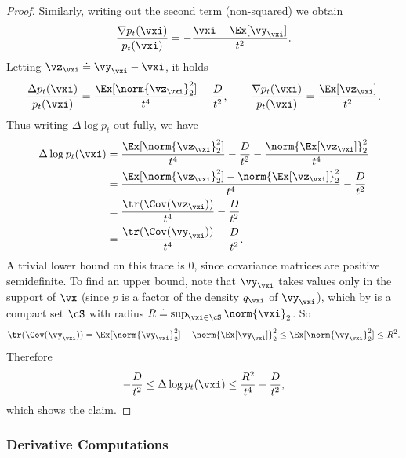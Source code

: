 \documentclass[../../book-main.tex]{subfiles}
\begin{document}
\begin{proof}
    Similarly, writing out the second term (non-squared) we obtain
    \begin{equation}
        \frac{\nabla p_{t}(\vxi)}{p_{t}(\vxi)} = -\frac{\vxi -
        \Ex[\vy_{\vxi}]}{t^{2}}.
    \end{equation}
    Letting \(\vz_{\vxi} \doteq \vy_{\vxi} - \vxi\), it holds
    \begin{equation}
        \frac{\Delta p_{t}(\vxi)}{p_{t}(\vxi)} =
        \frac{\Ex[\norm{\vz_{\vxi}}_{2}^{2}]}{t^{4}} -
        \frac{D}{t^{2}}, \qquad \frac{\nabla
        p_{t}(\vxi)}{p_{t}(\vxi)} = \frac{\Ex[\vz_{\vxi}]}{t^{2}}.
    \end{equation}
    Thus writing \(\Delta \log p_{t}\) out fully, we have
    \begin{align}
        \Delta \log p_{t}(\vxi)
        &= \frac{\Ex[\norm{\vz_{\vxi}}_{2}^{2}]}{t^{4}} -
        \frac{D}{t^{2}} - \frac{\norm{\Ex[\vz_{\vxi}]}_{2}^{2}}{t^{4}} \\
        &= \frac{\Ex[\norm{\vz_{\vxi}}_{2}^{2}] -
        \norm{\Ex[\vz_{\vxi}]}_{2}^{2}}{t^{4}} - \frac{D}{t^{2}} \\
        &= \frac{\tr(\Cov(\vz_{\vxi}))}{t^{4}} - \frac{D}{t^{2}} \\
        &= \frac{\tr(\Cov(\vy_{\vxi}))}{t^{4}} - \frac{D}{t^{2}}.
    \end{align}
    A trivial lower bound on this trace is \(0\), since covariance
    matrices are positive semidefinite. To find an upper bound, note
    that \(\vy_{\vxi}\) takes values only in the support of \(\vx\)
    (since \(p\) is a factor of the density \(q_{\vxi}\) of
    \(\vy_{\vxi}\)), which by
     is a compact set
    \(\cS\) with radius \(R \doteq \sup_{\vxi \in \cS}\norm{\vxi}_{2}\). So
    \begin{equation}
        \tr(\Cov(\vy_{\vxi})) = \Ex[\norm{\vy_{\vxi}}_{2}^{2}] -
        \norm{\Ex[\vy_{\vxi}]}_{2}^{2} \leq
        \Ex[\norm{\vy_{\vxi}}_{2}^{2}] \leq R^{2}.
    \end{equation}
    Therefore
    \begin{equation}
        -\frac{D}{t^{2}} \leq \Delta \log p_{t}(\vxi) \leq
        \frac{R^{2}}{t^{4}} - \frac{D}{t^{2}},
    \end{equation}
    which shows the claim.
\end{proof}

\subsubsection{Derivative Computations}
\end{document}
